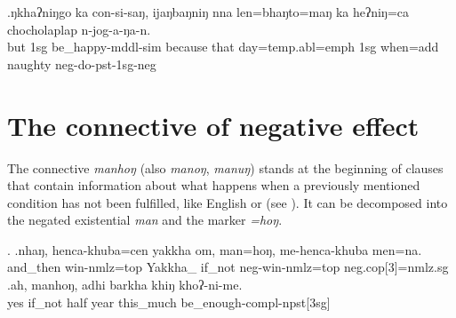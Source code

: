 \exg.ŋkhaʔniŋgo ka  con-si-saŋ,   ijaŋbaŋniŋ   nna  len=bhaŋto=maŋ      ka  heʔniŋ=ca        chocholaplap n-jog-a-ŋa-n.\\
	but {\sc 1sg}   be\_happy{\sc -mddl-sim} because that day{\sc =temp.abl=emph} {\sc 1sg} when{\sc =add} naughty {\sc neg-}do{\sc -pst-1sg-neg} \\
	 

\section{The connective of negative effect}

The connective \emph{manhoŋ} (also \emph{manoŋ}, \emph{manuŋ}) stands at the beginning of clauses that contain information about what happens when a previously mentioned condition has not been fulfilled, like English  or  (see \Next). It can be decomposed into the  negated existential  \emph{man} and the  marker \emph{=hoŋ}.

\ex. \ag.nhaŋ,    henca-khuba=cen               yakkha          om, man=hoŋ, me-henca-khuba               men=na.\\
and\_then win{\sc -nmlz=top} Yakkha\_ if\_not {\sc neg-}win{\sc -nmlz=top} {\sc neg.cop[3]=nmlz.sg}\\
 
\bg.ah,    manhoŋ,  adhi barkha khiŋ     khoʔ-ni-me.\\
yes if\_not half year this\_much be\_enough{\sc -compl-npst[3sg]}\\
 



